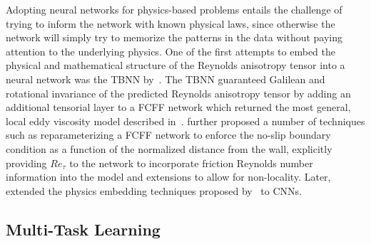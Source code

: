 \documentclass[11pt]{article}
\numberwithin{equation}{section}
\theoremstyle{plain}
\theoremstyle{definition}
\begin{document}
Adopting neural networks for physics-based problems entails the challenge of trying to inform the network with known physical laws, since otherwise the network will simply try to memorize the patterns in the data without paying attention to the underlying physics. One of the first attempts to embed the physical and mathematical structure of the Reynolds anisotropy tensor into a neural network was the TBNN by~\cite{ling2016reynolds}. The TBNN guaranteed Galilean and rotational invariance of the predicted Reynolds anisotropy tensor by adding an additional tensorial layer to a FCFF network which returned the most general, local eddy viscosity model described in~\cite{pope_1975}. \cite{fang2018deep} further proposed a number of techniques such as reparameterizing a FCFF network to enforce the no-slip boundary condition as a function of the normalized distance from the wall, explicitly providing $Re_{\tau}$ to the network to incorporate friction Reynolds number information into the model and extensions to allow for non-locality. Later, \cite{borde2021convolutional} extended the physics embedding techniques proposed by~\cite{fang2018deep} to CNNs.



\subsection{Multi-Task Learning}
\label{subsec:Multi-Task Learning}
\end{document}
